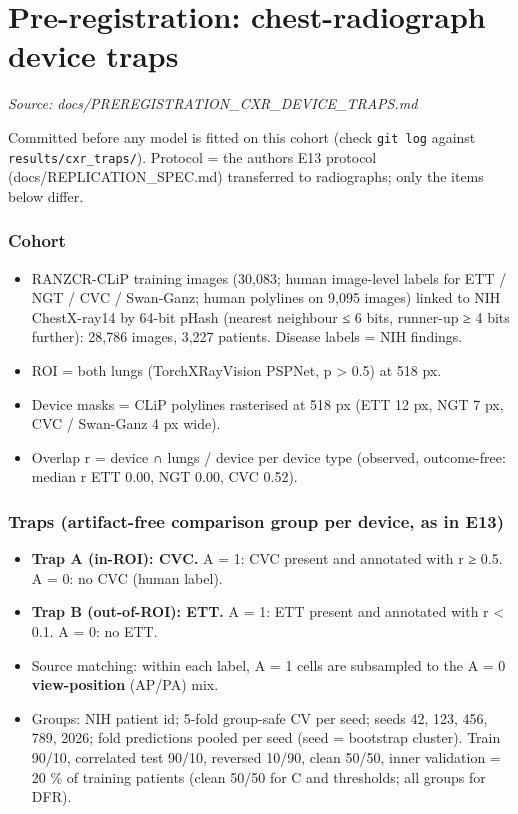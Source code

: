 \section{Pre-registration: chest-radiograph device traps}\label{doc:PREREGISTRATION_CXR_DEVICE_TRAPS}
\noindent\textit{Source: docs/PREREGISTRATION\_CXR\_DEVICE\_TRAPS.md}

{\small
Committed before any model is fitted on this cohort (check \texttt{git\ log} against \texttt{results/cxr\_traps/}).
Protocol = the author\textquotesingle s E13 protocol (docs/REPLICATION\_SPEC.md) transferred to radiographs; only the items
below differ.

\subsubsection{Cohort}\label{cohort}

\begin{itemize}

\item
  RANZCR-CLiP training images (30,083; human image-level labels for ETT / NGT / CVC / Swan-Ganz; human
  polylines on 9,095 images) linked to NIH ChestX-ray14 by 64-bit pHash (nearest neighbour ≤ 6 bits, runner-up
  ≥ 4 bits further): 28,786 images, 3,227 patients. Disease labels = NIH findings.
\item
  ROI = both lungs (TorchXRayVision PSPNet, p \textgreater{} 0.5) at 518 px.
\item
  Device masks = CLiP polylines rasterised at 518 px (ETT 12 px, NGT 7 px, CVC / Swan-Ganz 4 px wide).
\item
  Overlap r = \textbar device ∩ lungs\textbar{} / \textbar device\textbar{} per device type (observed, outcome-free: median r ETT 0.00,
  NGT 0.00, CVC 0.52).
\end{itemize}

\subsubsection{Traps (artifact-free comparison group per device, as in E13)}\label{traps-artifact-free-comparison-group-per-device-as-in-e13}

\begin{itemize}

\item
  \textbf{Trap A (in-ROI): CVC.} A = 1: CVC present and annotated with r ≥ 0.5. A = 0: no CVC (human label).
\item
  \textbf{Trap B (out-of-ROI): ETT.} A = 1: ETT present and annotated with r \textless{} 0.1. A = 0: no ETT.
\item
  Source matching: within each label, A = 1 cells are subsampled to the A = 0 \textbf{view-position} (AP/PA) mix.
\item
  Groups: NIH patient id; 5-fold group-safe CV per seed; seeds 42, 123, 456, 789, 2026; fold predictions pooled
  per seed (seed = bootstrap cluster). Train 90/10, correlated test 90/10, reversed 10/90, clean 50/50,
  inner validation = 20 \% of training patients (clean 50/50 for C and thresholds; all groups for DFR).
\end{itemize}

}
